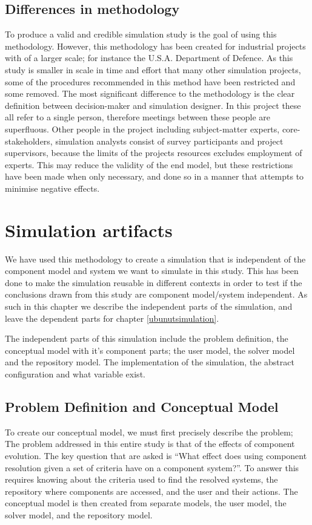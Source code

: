 \subsection{Differences in methodology}
To produce a valid and credible simulation study is the goal of using this methodology.
However, this methodology has been created for industrial projects with of a larger scale; for instance the U.S.A. Department of Defence.
As this study is smaller in scale in time and effort that many other simulation projects, some of the procedures recommended in this method have been restricted and some removed.
The most significant difference to the methodology is the clear definition between decision-maker and simulation designer.
In this project these all refer to a single person, therefore meetings between these people are superfluous.
Other people in the project including subject-matter experts, core-stakeholders, simulation analysts consist of survey participants and
project supervisors, because the limits of the projects resources excludes employment of experts.
This may reduce the validity of the end model, but these restrictions have been made when only necessary,
and done so in a manner that attempts to minimise negative effects.


\section{Simulation artifacts}
We have used this methodology to create a simulation that is independent of the component model and system we want to simulate in this study.
This has been done to make the simulation reusable in different contexts in order to test if the conclusions drawn from this study are component model/system independent.
As such in this chapter we describe the independent parts of the simulation, and leave the dependent parts for chapter \ref{ubunutsimulation}.

The independent parts of this simulation include the problem definition, the conceptual model with it's component parts;
the user model, the solver model and the repository model.
The implementation of the simulation, the abstract configuration and what variable exist.

\subsection{Problem Definition and Conceptual Model}
To create our conceptual model, we must first precisely describe the problem;
The problem addressed in this entire study is that of the effects of component evolution.
The key question that are asked is
``What effect does using component resolution given a set of criteria have on a component system?''.
To answer this requires knowing about the criteria used to find the resolved systems, the repository where components are accessed,
and the user and their actions.
The conceptual model is then created from separate models, the user model, the solver model, and the repository model.

